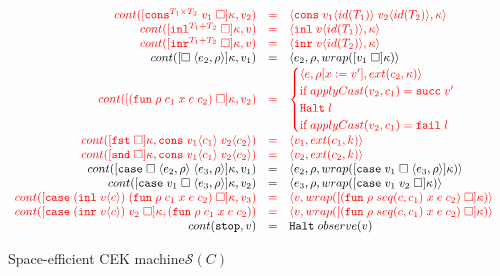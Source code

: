 \documentclass[acmsmall,review,anonymous]{acmart}\settopmatter{printfolios=true,printccs=false,printacmref=false}
\newcommand{\funrule}[3]{#1 &=& #2 & #3\\}
\newcommand{\hifunrule}[3]{\highlight{#1} &\highlight{=}& \highlight{#2} & 
\highlight{#3}\\}
\newcommand{\plus}[0]{+}
\newcommand{\sOOinspect}[3]{\langle#1,#2,#3\rangle}
\newcommand{\sOOreturn}[2]{\langle#1,#2\rangle}
\newcommand{\sOOhalt}[1]{\mathtt{Halt} \; #1}
\newcommand{\POOprod}[2]{#1 \times #2}
\newcommand{\POOsum}[2]{#1 \plus #2}
\newcommand{\rOOsucc}[1]{\mathtt{succ}\;#1}
\newcommand{\rOOfail}[1]{\mathtt{fail}\;#1}
\newcommand{\kOOmt}[0]{\mathtt{stop}}
\newcommand{\kOOconsII}[4]{
	[\mathtt{cons}^{\POOprod{#1}{#2}} \; #3 \; \square]#4}
\newcommand{\kOOinl}[3]{[\mathtt{inl}^{\POOsum{#1}{#2}}\; \square]#3}
\newcommand{\kOOinr}[3]{[\mathtt{inr}^{\POOsum{#1}{#2}}\; \square]#3}
\newcommand{\kOOappI}[3]{
  [\square \; \langle#1,#2\rangle]#3
}
\newcommand{\kOOappII}[2]{
  [#1 \; \square]#2}
\newcommand{\kOOcar}[1]{[\mathtt{fst} \; \square]#1}
\newcommand{\kOOcdr}[1]{[\mathtt{snd} \; \square]#1}
\newcommand{\kOOcaseI}[4]{
  [\mathtt{case} \; \square \; \langle#1,#3\rangle \; \langle#2,#3\rangle ]#4}
\newcommand{\kOOcaseII}[4]{
  [\mathtt{case} \; #1 \; \square \; \langle#2,#3\rangle ]#4}
\newcommand{\kOOcaseIII}[3]{
  [\mathtt{case} \; #1 \; #2 \; \square]#3}
\newcommand{\hcvOOfun}[5]{\mathtt{fun} \; #2 \; #1 \; #3 \; #4 \; #5}
\newcommand{\hcvOOcons}[4]{\mathtt{cons}\;#1\langle#2\rangle\;#3\langle#4\rangle}
\newcommand{\hcvOOinl}[2]{\mathtt{inl}\;#1\langle#2\rangle}
\newcommand{\hcvOOinr}[2]{\mathtt{inr}\;#1\langle#2\rangle}
\newcommand{\hckOOmt}[0]{\mathtt{stop}}
\newcommand{\sidecond}[1]{\text{if}\;#1}
\newcommand{\judgeSreduceTrans}[3]{#2 \longmapsto_{\mathcal{S}(#1)}^{*} #3}
\newcommand{\judgeSeval}[3]{eval_{\mathcal{S}(#1)}(#2) = #3}
\newcommand{\continue}[2]{cont(#2,#1)}
\newcommand{\highlight}[1]{{\color{red} #1}}
\begin{document}
\begin{figure}
\[\begin{array}{rclr}
\hifunrule{
  \continue{v_2}{\kOOconsII{T_1}{T_2}{v_1}{\kappa}}}{
  \sOOreturn{\hcvOOcons{v_1}{id(T_1)}{v_2}{id(T_2)}}{\kappa}}{}

\hifunrule{
  \continue{v}{\kOOinl{T_1}{T_2}{\kappa}}}{
  \sOOreturn{\hcvOOinl{v}{id(T_1)}}{\kappa}}{}

\hifunrule{
  \continue{v}{\kOOinr{T_1}{T_2}{\kappa}}}{
  \sOOreturn{\hcvOOinr{v}{id(T_2)}}{\kappa}}{}

\funrule{
  \continue{v_1}{\kOOappI{e_2}{\rho}{\kappa}}}{
  \sOOinspect{e_2}{\rho}{
    wrap(\kOOappII{v_1}{\kappa})
  }}{}

\hifunrule{
  \continue{v_2}{\kOOappII{(\hcvOOfun{c_1}{\rho}{x}{e}{c_2})}{\kappa}}}{
\begin{cases}
\sOOinspect{e}{\rho[x:=v']}{ext(c_2,\kappa)} \\
\sidecond{applyCast(v_2,c_1) = \rOOsucc{v'}}
\\
\sOOhalt{l} \\
\sidecond{applyCast(v_2,c_1) = \rOOfail{l}}
\end{cases}
}{}


\hifunrule{
  \continue{\hcvOOcons{v_1}{c_1}{v_2}{c_2}}{
    \kOOcar{\kappa}
  }
}{
  \sOOreturn{v_1}{ext(c_1,k)}
}{}
\hifunrule{
  \continue{\hcvOOcons{v_1}{c_1}{v_2}{c_2}}{
    \kOOcdr{\kappa}
  }
}{
  \sOOreturn{v_2}{ext(c_2,k)}
}{}

\funrule{
  \continue{v_1}{\kOOcaseI{e_2}{e_3}{\rho}{\kappa}}
}{
  \sOOinspect{e_2}{\rho}{
    wrap(\kOOcaseII{v_1}{e_3}{\rho}{\kappa})
  }
}{}

\funrule{
  \continue{v_2}{
    \kOOcaseII{v_1}{e_3}{\rho}{\kappa}
  }
}{
  \sOOinspect{e_3}{\rho}{
  wrap(\kOOcaseIII{v_1}{v_2}{\kappa})
  }
}{}

\hifunrule{
  \continue{v_3}{
    \kOOcaseIII{(\hcvOOinl{v}{c})}{(\hcvOOfun{c_1}{\rho}{x}{e}{c_2})}{\kappa}
  }
}{
  \sOOreturn{v}{wrap(\kOOappII{(\hcvOOfun{seq(c,c_1)}{\rho}{x}{e}{c_2})}{\kappa})}
}{}

\hifunrule{
  \continue{(\hcvOOfun{c_1}{\rho}{x}{e}{c_2})}
  {
    \kOOcaseIII{(\hcvOOinr{v}{c})}{v_2}{\kappa}
  }
}{
  \sOOreturn{v}{wrap(\kOOappII{(\hcvOOfun{seq(c,c_1)}{\rho}{x}{e}{c_2})}{\kappa})}
}{}

\funrule{
  \continue{v}{\kOOmt}}{
  \sOOhalt{observe(v)}}{}
  
  \end{array}\]
  
  
  
  \caption{Space-efficient CEK machine$\mathcal{S}(C)$}
  \label{fig:machine-cekcc}
\end{figure}
\end{document}
